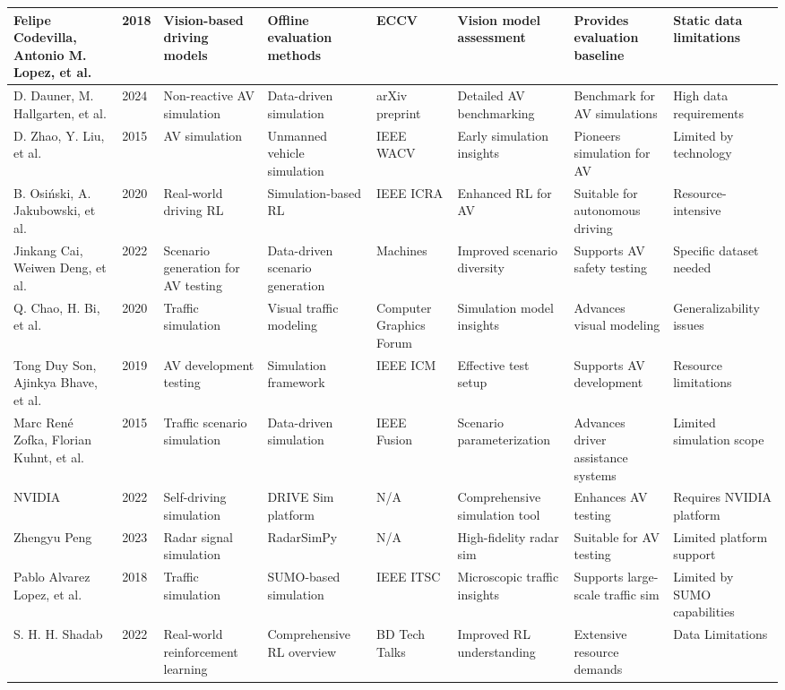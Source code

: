 \documentclass[lettersize,journal]{IEEEtran}
\begin{document}
\begin{longtable}{|p{2cm}|p{1cm}|p{2cm}|p{2cm}|p{2cm}|p{2cm}|p{2cm}|p{2.5cm}|}
\hline
Felipe Codevilla, Antonio M. Lopez, et al. & 2018 & Vision-based driving models & Offline evaluation methods & ECCV & Vision model assessment & Provides evaluation baseline & Static data limitations \\
\hline
D. Dauner, M. Hallgarten, et al. & 2024 & Non-reactive AV simulation & Data-driven simulation & arXiv preprint & Detailed AV benchmarking & Benchmark for AV simulations & High data requirements \\
\hline
D. Zhao, Y. Liu, et al. & 2015 & AV simulation & Unmanned vehicle simulation & IEEE WACV & Early simulation insights & Pioneers simulation for AV & Limited by technology \\
\hline
B. Osiński, A. Jakubowski, et al. & 2020 & Real-world driving RL & Simulation-based RL & IEEE ICRA & Enhanced RL for AV & Suitable for autonomous driving & Resource-intensive \\
\hline
Jinkang Cai, Weiwen Deng, et al. & 2022 & Scenario generation for AV testing & Data-driven scenario generation & Machines & Improved scenario diversity & Supports AV safety testing & Specific dataset needed \\
\hline
Q. Chao, H. Bi, et al. & 2020 & Traffic simulation & Visual traffic modeling & Computer Graphics Forum & Simulation model insights & Advances visual modeling & Generalizability issues \\
\hline
Tong Duy Son, Ajinkya Bhave, et al. & 2019 & AV development testing & Simulation framework & IEEE ICM & Effective test setup & Supports AV development & Resource limitations \\
\hline
Marc René Zofka, Florian Kuhnt, et al. & 2015 & Traffic scenario simulation & Data-driven simulation & IEEE Fusion & Scenario parameterization & Advances driver assistance systems & Limited simulation scope \\
\hline
NVIDIA & 2022 & Self-driving simulation & DRIVE Sim platform & N/A & Comprehensive simulation tool & Enhances AV testing & Requires NVIDIA platform \\
\hline
Zhengyu Peng & 2023 & Radar signal simulation & RadarSimPy & N/A & High-fidelity radar sim & Suitable for AV testing & Limited platform support \\
\hline
Pablo Alvarez Lopez, et al. & 2018 & Traffic simulation & SUMO-based simulation & IEEE ITSC & Microscopic traffic insights & Supports large-scale traffic sim & Limited by SUMO capabilities \\
\hline
S. H. H. Shadab & 2022 & Real-world reinforcement learning & Comprehensive RL overview & BD Tech Talks & Improved RL understanding & Extensive resource demands & Data Limitations \\

\end{longtable}
\end{document}
